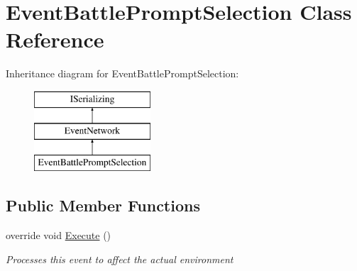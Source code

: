 \hypertarget{class_event_battle_prompt_selection}{\section{Event\-Battle\-Prompt\-Selection Class Reference}
\label{class_event_battle_prompt_selection}
}
Inheritance diagram for Event\-Battle\-Prompt\-Selection\-:\begin{figure}[H]
\begin{center}
\leavevmode
\includegraphics[height=3.000000cm]{class_event_battle_prompt_selection}
\end{center}
\end{figure}
\subsection*{Public Member Functions}
\begin{DoxyCompactItemize}
\item 
override void \hyperlink{class_event_battle_prompt_selection_aed70e58f6ae8cb1e78b7b11869faf1e5}{Execute} ()
\begin{DoxyCompactList}\small\item\em Processes this event to affect the actual environment \end{DoxyCompactList}\end{DoxyCompactItemize}

